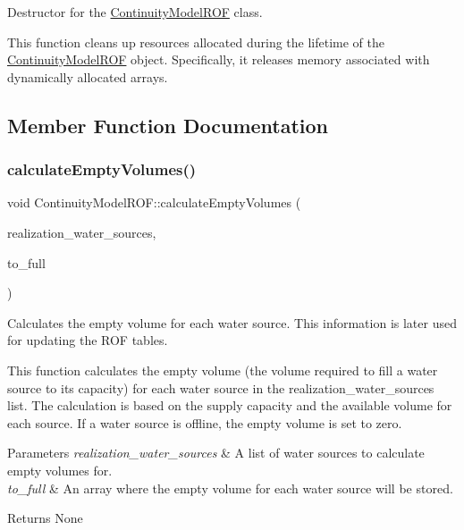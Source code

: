 Destructor for the \mbox{\hyperlink{classContinuityModelROF}{Continuity\+Model\+R\+OF}} class. 

This function cleans up resources allocated during the lifetime of the \mbox{\hyperlink{classContinuityModelROF}{Continuity\+Model\+R\+OF}} object. Specifically, it releases memory associated with dynamically allocated arrays. 

\subsection{Member Function Documentation}
\mbox{\label{classContinuityModelROF_aa720006d12410fc35b8768eda716c149}} 
\subsubsection{\texorpdfstring{calculate\+Empty\+Volumes()}{calculateEmptyVolumes()}}
{\footnotesize\ttfamily void Continuity\+Model\+R\+O\+F\+::calculate\+Empty\+Volumes (\begin{DoxyParamCaption}\item[{vector$<$ \mbox{\hyperlink{classWaterSource}{Water\+Source}} $\ast$$>$ \&}]{realization\+\_\+water\+\_\+sources,  }\item[{double $\ast$}]{to\+\_\+full }\end{DoxyParamCaption})}



Calculates the empty volume for each water source. This information is later used for updating the R\+OF tables. 

This function calculates the empty volume (the volume required to fill a water source to its capacity) for each water source in the {\ttfamily realization\+\_\+water\+\_\+sources} list. The calculation is based on the supply capacity and the available volume for each source. If a water source is offline, the empty volume is set to zero.


\begin{DoxyParams}{Parameters}
{\em realization\+\_\+water\+\_\+sources} & A list of water sources to calculate empty volumes for. \\
\hline
{\em to\+\_\+full} & An array where the empty volume for each water source will be stored.\\
\hline
\end{DoxyParams}
\begin{DoxyReturn}{Returns}
None 
\end{DoxyReturn}
\mbox{\label{classContinuityModelROF_a0b66880fe153cbd0b85a5b416b98e9a6}} 
